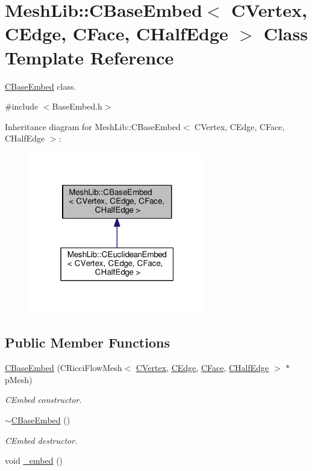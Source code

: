 \hypertarget{class_mesh_lib_1_1_c_base_embed}{}\section{Mesh\+Lib\+:\+:C\+Base\+Embed$<$ C\+Vertex, C\+Edge, C\+Face, C\+Half\+Edge $>$ Class Template Reference}
\label{class_mesh_lib_1_1_c_base_embed}


\hyperlink{class_mesh_lib_1_1_c_base_embed}{C\+Base\+Embed} class.  




{\ttfamily \#include $<$Base\+Embed.\+h$>$}



Inheritance diagram for Mesh\+Lib\+:\+:C\+Base\+Embed$<$ C\+Vertex, C\+Edge, C\+Face, C\+Half\+Edge $>$\+:
\nopagebreak
\begin{figure}[H]
\begin{center}
\leavevmode
\includegraphics[width=220pt]{class_mesh_lib_1_1_c_base_embed__inherit__graph}
\end{center}
\end{figure}
\subsection*{Public Member Functions}
\begin{DoxyCompactItemize}
\item 
\hyperlink{class_mesh_lib_1_1_c_base_embed_ac6cfdbea469712b1d86d814e9bfae1a0}{C\+Base\+Embed} (C\+Ricci\+Flow\+Mesh$<$ \hyperlink{class_mesh_lib_1_1_c_vertex}{C\+Vertex}, \hyperlink{class_mesh_lib_1_1_c_edge}{C\+Edge}, \hyperlink{class_mesh_lib_1_1_c_face}{C\+Face}, \hyperlink{class_mesh_lib_1_1_c_half_edge}{C\+Half\+Edge} $>$ $\ast$p\+Mesh)
\begin{DoxyCompactList}\small\item\em C\+Embed constructor. \end{DoxyCompactList}\item 
\hyperlink{class_mesh_lib_1_1_c_base_embed_a97493bfd00df5af9048599c35f7722ef}{$\sim$\+C\+Base\+Embed} ()
\begin{DoxyCompactList}\small\item\em C\+Embed destructor. \end{DoxyCompactList}\item 
void \hyperlink{class_mesh_lib_1_1_c_base_embed_a5128819dbda9081bcaf0e4e75f82fa91}{\+\_\+embed} ()
\end{DoxyCompactItemize}
